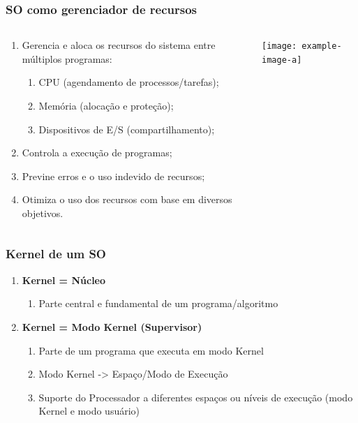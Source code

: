\documentclass{beamer}
\begin{document}
\begin{frame}[fragile]
    \frametitle{SO como gerenciador de recursos}

    \begin{columns}
        \begin{column}{0.55\textwidth}
            \begin{enumerate}\small
                \item Gerencia e aloca os recursos do sistema entre múltiplos programas:
                \begin{enumerate}\footnotesize
                    \item CPU (agendamento de processos/tarefas);
                    \item Memória (alocação e proteção);
                    \item Dispositivos de E/S (compartilhamento);
                \end{enumerate}
                \item Controla a execução de programas;
                \item Previne erros e o uso indevido de recursos;
                \item Otimiza o uso dos recursos com base em diversos objetivos.
            \end{enumerate}
        \end{column}
        
        \begin{column}{0.45\textwidth}
            \begin{center}
                \texttt{[image: example-image-a]}
            \end{center}
        \end{column}
    \end{columns}
\end{frame}

\begin{frame}[fragile]
\frametitle{Kernel de um SO}

\begin{enumerate}\small
    \item \textbf{Kernel = Núcleo}
    \begin{enumerate}\footnotesize
        \item Parte central e fundamental de um programa/algoritmo
    \end{enumerate}
    
    \vfill
    \item \textbf{Kernel = Modo Kernel (Supervisor)}
    \begin{enumerate}\footnotesize
        \item Parte de um programa que executa em modo Kernel
        \item Modo Kernel -> Espaço/Modo de Execução
        \item Suporte do Processador a diferentes espaços ou níveis de execução (modo Kernel e modo usuário)
    \end{enumerate}
\end{enumerate}
\end{frame}
\end{document}
